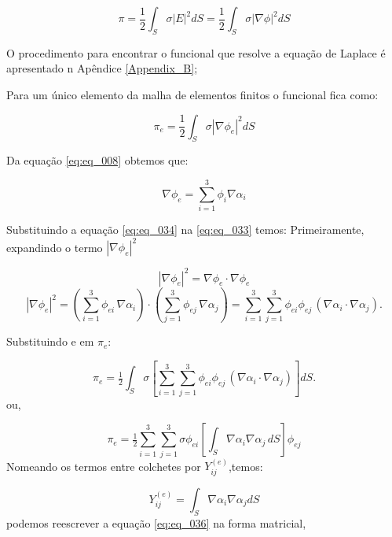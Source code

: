 \documentclass[
12pt,
a4paper,
oneside,
chapter=TITLE,
sumario=tradicional
]{abntex2}
\begin{document}
\begin{equation}
	\pi = \frac{1}{2}\int_S \sigma |E|^2 dS= \frac{1}{2}\int_S \sigma |\nabla \phi|^2 dS
	\label{eq:eq_032}
\end{equation}

O procedimento para encontrar o funcional que resolve a equação de Laplace é apresentado n Apêndice \ref{Appendix_B};

Para um único elemento da malha de elementos finitos o funcional fica como:


\begin{equation}
	\pi_e = \frac{1}{2}\int_S \sigma |\nabla \phi_e|^2 dS
	\label{eq:eq_033}
\end{equation}

Da equação \ref{eq:eq_008} obtemos que:

\begin{equation}
	\nabla \phi_e = \sum_{i=1}^{3} \phi_{i} \nabla \alpha_i
	\label{eq:eq_034}
\end{equation}

Substituindo a equação \ref{eq:eq_034} na \ref{eq:eq_033} temos:
Primeiramente, expandindo o termo $|\nabla \phi_e|^2$

\begin{equation*}
	|\nabla \phi_e|^2
	= \nabla \phi_e\cdot \nabla \phi_e
\end{equation*}
\begin{equation*}
	|\nabla \phi_e|^2
	= \left(\sum_{i=1}^3 \phi_{ei}\,\nabla \alpha_i\right)\cdot
	\left(\sum_{j=1}^3 \phi_{ej}\,\nabla \alpha_j\right)
	= \sum_{i=1}^3\sum_{j=1}^3
	\phi_{ei}\phi_{ej}\,(\nabla \alpha_i\cdot \nabla \alpha_j).
\end{equation*}

Substituindo e em $\pi_e$:

\begin{equation*}
	\pi_e=\tfrac12\int_S \sigma
	\left[\sum_{i=1}^3\sum_{j=1}^3
	\phi_{ei}\phi_{ej}\,(\nabla \alpha_i\cdot \nabla \alpha_j)\right] dS.
\end{equation*}
ou,

\begin{equation}
	\pi_e = \tfrac{1}{2} \sum_{i=1}^{3} \sum_{j=1}^{3} \sigma \phi_{ei} 
	\left[ \int_S \nabla \alpha_i \nabla \alpha_j \, dS \right] \phi_{ej} 
	\label{eq:eq_035}
\end{equation}
Nomeando os termos entre colchetes por $Y_{ij}^{(e)}$,temos:


\begin{equation}
	Y_{ij}^{(e)} = \int_S \nabla \alpha_i \nabla \alpha_j  dS
	\label{eq:eq_036}
\end{equation}
podemos reescrever a equação \ref{eq:eq_036} na forma matricial,
\end{document}

